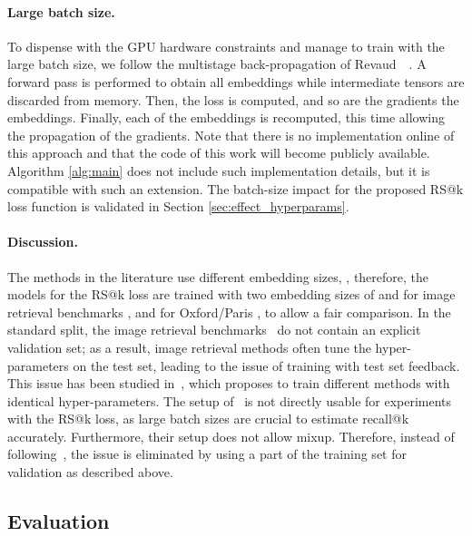 \paragraph{Large batch size.} To dispense with the GPU hardware constraints and manage to train with the large batch size, we follow the multistage back-propagation of Revaud~\etal~\cite{rar+19}. A forward pass is performed to obtain all embeddings while intermediate tensors are discarded from memory. Then, the loss is computed, and so are the gradients \wrt the embeddings. Finally, each of the embeddings is recomputed, this time allowing the propagation of the gradients. Note that there is no implementation online of this approach and that the code of this work will become publicly available. Algorithm \ref{alg:main} does not include such implementation details, but it is compatible with such an extension. The batch-size impact for the proposed RS@k loss function is validated in Section \ref{sec:effect_hyperparams}.

\paragraph{Discussion.} The methods in the literature use different embedding sizes, , therefore, the models for the RS@k loss are trained with two embedding sizes of  and  for image retrieval benchmarks \cite{vms+18,ltw+16,ohb16,ksd+13}, and  for Oxford/Paris \cite{rit+18}, to allow a fair comparison. In the standard split, the image retrieval benchmarks~\cite{ksd+13,ohb16,ltw+16,vms+18} do not contain an explicit validation set; as a result, image retrieval methods often tune the hyper-parameters on the test set, leading to the issue of training with test set feedback. This issue has been studied in~\cite{mbl20}, which proposes to train different methods with identical hyper-parameters. The setup of~\cite{mbl20} is not directly usable for experiments with the RS@k loss, as large batch sizes are crucial to estimate recall@k accurately. Furthermore, their setup does not allow mixup. Therefore, instead of following~\cite{mbl20}, the issue is eliminated by using a part of the training set for validation as described above. 


\subsection{Evaluation}
\label{sec:evaluation}

